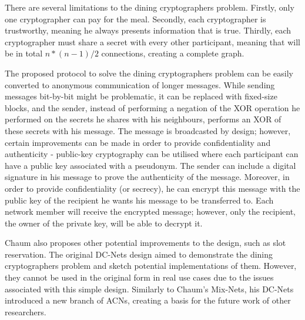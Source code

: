 There are several limitations to the dining cryptographers problem. Firstly, only one cryptographer can pay for the meal. Secondly, each cryptographer is trustworthy, meaning he always presents information that is true. Thirdly, each cryptographer must share a secret with every other participant, meaning that will be in total $n * (n-1) / 2$ connections, creating a complete graph.

The proposed protocol to solve the dining cryptographers problem can be easily converted to anonymous communication of longer messages. While sending messages bit-by-bit might be problematic, it can be replaced with fixed-size blocks, and the sender, instead of performing a negation of the XOR operation he performed on the secrets he shares with his neighbours, performs an XOR of these secrets with his message. The message is broadcasted by design; however, certain improvements can be made in order to provide confidentiality and authenticity - public-key cryptography can be utilised where each participant can have a public key associated with a pseudonym. The sender can include a digital signature in his message to prove the authenticity of the message. Moreover, in order to provide confidentiality (or secrecy), he can encrypt this message with the public key of the recipient he wants his message to be transferred to. Each network member will receive the encrypted message; however, only the recipient, the owner of the private key, will be able to decrypt it.

Chaum also proposes other potential improvements to the design, such as slot reservation.
The original DC-Nets design aimed to demonstrate the dining cryptographers problem and sketch potential implementations of them. However, they cannot be used in the original form in real use cases due to the issues associated with this simple design. Similarly to Chaum’s Mix-Nets, his DC-Nets introduced a new branch of ACNs, creating a basis for the future work of other researchers.

